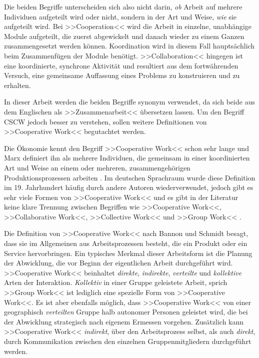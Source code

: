 	\medskip Die beiden Begriffe unterscheiden sich also nicht darin, \emph{ob} Arbeit auf mehrere Individuen aufgeteilt wird oder nicht, sondern in der Art und Weise, \emph{wie} sie aufgeteilt wird. Bei >>Cooperation<< wird die Arbeit in einzelne, unabhängige Module aufgeteilt, die zuerst abgewickelt und danach wieder zu einem Ganzen zusammengesetzt werden können. Koordination wird in diesem Fall hauptsächlich beim Zusammenfügen der Module benötigt. >>Collaboration<< hingegen ist eine koordinierte, synchrone Aktivität und resultiert aus dem fortwährenden Versuch, eine gemeinsame Auffassung eines Problems zu konstruieren und zu erhalten.
	
	In dieser Arbeit werden die beiden Begriffe synonym verwendet, da sich beide aus dem Englischen als >>Zusammenarbeit<< übersetzen lassen. Um den Begriff \ac{CSCW} jedoch besser zu verstehen, sollen weitere Definitionen von >>Cooperative Work<< begutachtet werden.
	
	Die Ökonomie kennt den Begriff >>Cooperative Work<< schon sehr lange und Marx definiert ihn als mehrere Individuen, die gemeinsam in einer koordinierten Art und Weise an einem oder mehreren, zusammengehörigen Produktionsprozessen arbeiten \citep{Marx:1867}. Im deutschen Sprachraum wurde diese Definition im 19. Jahrhundert häufig durch andere Autoren wiederverwendet, jedoch gibt es sehr viele Formen von >>Cooperative Work<< und es gibt in der Literatur keine klare Trennung zwischen Begriffen wie >>Cooperative Work<<, >>Collaborative Work<<, >>Collective Work<< und >>Group Work<< \citep{Bannon:1990p244}.
	
	Die Definition von >>Cooperative Work<< nach Bannon und Schmidt besagt, dass sie im Allgemeinen aus Arbeitsprozessen besteht, die ein Produkt oder ein Service hervorbringen. Ein typisches Merkmal dieser Arbeitsform ist die Planung der Abwicklung, die vor Beginn der eigentlichen Arbeit durchgeführt wird. >>Cooperative Work<< beinhaltet \emph{direkte}, \emph{indirekte}, \emph{verteilte} und \emph{kollektive} Arten der Interaktion. \emph{Kollektiv} in einer Gruppe geleistete Arbeit, sprich >>Group Work<< ist lediglich eine spezielle Form von >>Cooperative Work<<. Es ist aber ebenfalls möglich, dass >>Cooperative Work<< von einer geographisch \emph{verteilten} Gruppe halb autonomer Personen geleistet wird, die bei der Abwicklung strategisch nach eigenem Ermessen vorgehen. Zusätzlich kann >>Cooperative Work<< \emph{indirekt}, über den Arbeitsprozess selbst, als auch \emph{direkt}, durch Kommunikation zwischen den einzelnen Gruppenmitgliedern durchgeführt werden. \citep{Bannon:1990p244}
	
